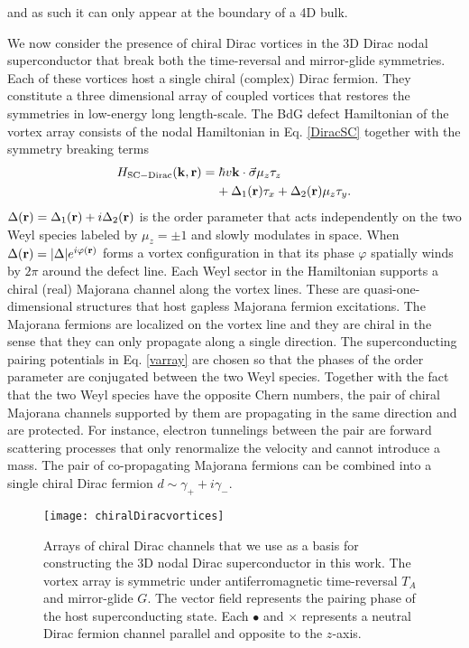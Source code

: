 and as such it can only appear at the boundary of a 4D bulk.



We now consider the presence of chiral Dirac vortices in the 3D Dirac nodal superconductor that break both the time-reversal and mirror-glide symmetries. Each of these vortices host a single chiral (complex) Dirac fermion. They constitute a three dimensional array of coupled vortices that restores the symmetries in low-energy long length-scale. The BdG defect Hamiltonian of the vortex array consists of the nodal Hamiltonian in Eq. \eqref{DiracSC} together with the symmetry breaking terms
\begin{align}
H_{\mathrm{SC-Dirac}}({\bf k},{\bf r})&=\hbar v{\bf k}\cdot\vec\sigma\mu_z\tau_z\nonumber\\&\;\;\;\;+\Delta_1({\bf r})\tau_x+\Delta_2({\bf r})\mu_z\tau_y.
\label{varray}
\end{align} $\Delta({\bf r})=\Delta_1({\bf r})+i\Delta_2({\bf r})$ is the order parameter that acts independently on the two Weyl species labeled by $\mu_z=\pm1$ and slowly modulates in space. When $\Delta({\bf r})=|\Delta|e^{i\varphi({\bf r})}$ forms a vortex configuration in that its phase $\varphi$ spatially winds by $2\pi$ around the defect line. Each Weyl sector in the Hamiltonian supports a chiral (real) Majorana channel along the vortex lines. These are quasi-one-dimensional structures that host gapless Majorana fermion excitations. The Majorana fermions are localized on the vortex line and they are chiral in the sense that they can only propagate along a single direction. The superconducting pairing potentials in Eq. \eqref{varray} are chosen so that the phases of the order parameter are conjugated between the two Weyl species. Together with the fact that the two Weyl species have the opposite Chern numbers, the pair of chiral Majorana channels supported by them are propagating in the same direction and are protected. For instance, electron tunnelings between the pair are forward scattering processes that only renormalize the velocity and cannot introduce a mass. The pair of co-propagating Majorana fermions can be combined into a single chiral Dirac fermion $d\sim\gamma_++i\gamma_-$.


\begin{figure}[htbp]
	\centering\texttt{[image: chiralDiracvortices]}
	\caption[Arrays of chiral Dirac channels that we use as a basis for constructing the 3D nodal Dirac superconductor in this work.]{Arrays of chiral Dirac channels that we use as a basis for constructing the 3D nodal Dirac superconductor in this work. The vortex array is symmetric under antiferromagnetic time-reversal $T_A$ and mirror-glide $G$. The vector field represents the pairing phase of the host superconducting state. Each {\color{green}$\bullet$} and {\color{red}$\times$} represents a neutral Dirac fermion channel parallel and opposite to the $z$-axis.}\label{fig:chiralDiracvortices}
\end{figure}

